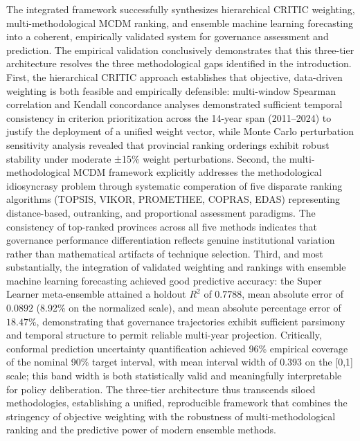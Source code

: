\documentclass[12pt,a4paper]{article}
\begin{document}
The integrated framework successfully synthesizes hierarchical CRITIC weighting, multi-methodological MCDM ranking, and ensemble machine learning forecasting into a coherent, empirically validated system for governance assessment and prediction. The empirical validation conclusively demonstrates that this three-tier architecture resolves the three methodological gaps identified in the introduction. First, the hierarchical CRITIC approach establishes that objective, data-driven weighting is both feasible and empirically defensible: multi-window Spearman correlation and Kendall concordance analyses demonstrated sufficient temporal consistency in criterion prioritization across the 14-year span (2011--2024) to justify the deployment of a unified weight vector, while Monte Carlo perturbation sensitivity analysis revealed that provincial ranking orderings exhibit robust stability under moderate ±15\% weight perturbations. Second, the multi-methodological MCDM framework explicitly addresses the methodological idiosyncrasy problem through systematic comperation of five disparate ranking algorithms (TOPSIS, VIKOR, PROMETHEE, COPRAS, EDAS) representing distance-based, outranking, and proportional assessment paradigms. The consistency of top-ranked provinces across all five methods indicates that governance performance differentiation reflects genuine institutional variation rather than mathematical artifacts of technique selection. Third, and most substantially, the integration of validated weighting and rankings with ensemble machine learning forecasting achieved good predictive accuracy: the Super Learner meta-ensemble attained a holdout $R^2$ of $0.7788$, mean absolute error of $0.0892$ (8.92\% on the normalized scale), and mean absolute percentage error of $18.47\%$, demonstrating that governance trajectories exhibit sufficient parsimony and temporal structure to permit reliable multi-year projection. Critically, conformal prediction uncertainty quantification achieved 96\% empirical coverage of the nominal 90\% target interval, with mean interval width of 0.393 on the [0,1] scale; this band width is both statistically valid and meaningfully interpretable for policy deliberation. The three-tier architecture thus transcends siloed methodologies, establishing a unified, reproducible framework that combines the stringency of objective weighting with the robustness of multi-methodological ranking and the predictive power of modern ensemble methods.
\end{document}
